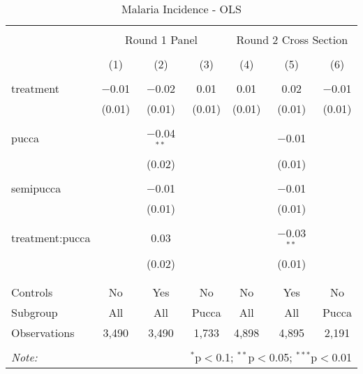 
\begin{table}[!htbp] \centering 
  \caption{Malaria Incidence - OLS} 
  \label{tbl:Malaria Incidence - OLS} 
\begin{tabular}{@{\extracolsep{5pt}}lcccccc} 
\\[-1.8ex]\hline 
\hline \\[-1.8ex] 
 & \multicolumn{3}{c}{Round 1 Panel} & \multicolumn{3}{c}{Round 2 Cross Section} \\ 
\\[-1.8ex] & (1) & (2) & (3) & (4) & (5) & (6)\\ 
\hline \\[-1.8ex] 
 treatment & $-$0.01 & $-$0.02 & 0.01 & 0.01 & 0.02 & $-$0.01 \\ 
  & (0.01) & (0.01) & (0.01) & (0.01) & (0.01) & (0.01) \\ 
  & & & & & & \\ 
 pucca &  & $-$0.04$^{**}$ &  &  & $-$0.01 &  \\ 
  &  & (0.02) &  &  & (0.01) &  \\ 
  & & & & & & \\ 
 semipucca &  & $-$0.01 &  &  & $-$0.01 &  \\ 
  &  & (0.01) &  &  & (0.01) &  \\ 
  & & & & & & \\ 
 treatment:pucca &  & 0.03 &  &  & $-$0.03$^{**}$ &  \\ 
  &  & (0.02) &  &  & (0.01) &  \\ 
  & & & & & & \\ 
\hline \\[-1.8ex] 
Controls & No & Yes & No & No & Yes & No \\ 
Subgroup & All & All & Pucca & All & All & Pucca \\ 
Observations & 3,490 & 3,490 & 1,733 & 4,898 & 4,895 & 2,191 \\ 
\hline 
\hline \\[-1.8ex] 
\textit{Note:}  & \multicolumn{6}{r}{$^{*}$p$<$0.1; $^{**}$p$<$0.05; $^{***}$p$<$0.01} \\ 
\end{tabular} 
\end{table} 
